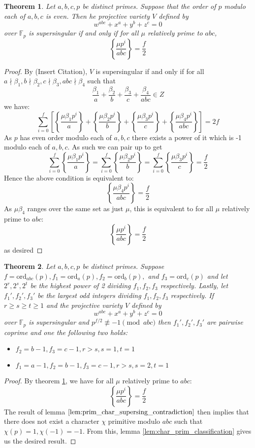 \documentclass{article}
\newcommand{\F}{\mathbb{F}}
\newcommand{\ord}[0]{\mathrm{ord}}
\newcommand{\frp}[2]{\left\{\frac{#1}{#2}\right\}}
\newtheorem{theorem}{Theorem}[section]
\theoremstyle{definition}
\theoremstyle{definition}
\theoremstyle{remark}
\begin{document}
\begin{theorem} \label{thm:sum_mu_abc_supersing_cond}
Let $a,b,c,p$ be distinct primes. Suppose that the order of $p$ modulo each of $a,b,c$ is even. Then
he projective variety $V$ defined by
\[w^{abc} + x^a + y^b + z^c =0\]
over $\F_p$ is supersingular if and only if for all $\mu$ relatively prime to $abc$,
\[\frp{\mu p^i}{abc} = \frac{f}{2}\]
\end{theorem}
\begin{proof}
By (Insert Citation), $V$ is supersingular if and only if for all $a\nmid \beta_1, b\nmid \beta_2, c\nmid \beta_3, abc \nmid \beta_4$ such that
\[\frac{\beta_1}{a} + \frac{\beta_2}{b} + \frac{\beta_3}{c} + \frac{\beta_4}{abc} \in Z\] 
we have:
\[\sum_{i = 0}^f \left[\frp{ \mu\beta_1 p^i}{a} + \frp{\mu \beta_2 p^i }{b} + \frp{\mu \beta_3 p^i}{c} + \frp{\mu \beta_4 p^i}{abc}\right] = 2f \]
As $p$ has even order modulo each of $a,b,c$ there exists a power of it which is -1 modulo each of $a,b,c$. As such we can pair up to get
\[\sum_{i = 0}^f \frp{ \mu\beta_1 p^i}{a} = \sum_{i = 0}^f \frp{ \mu\beta_2 p^i}{b} = \sum_{i = 0}^f \frp{ \mu\beta_3 p^i}{c} = \frac{f}{2}\]
Hence the above condition is equivalent to:
\[\frp{\mu \beta_4 p^i}{abc} = \frac{f}{2}\]
As $\mu\beta_4$ ranges over the same set as just $\mu$, this is equivalent to for all $\mu$ relatively prime to $abc$:
\[\frp{\mu p^i}{abc} = \frac{f}{2}\]
as desired
\end{proof}

\begin{theorem} \label{thm:a_b_c_supersingular_cond1} Let $a,b,c,p$ be distinct primes. Suppose $f = \ord_{abc}(p), f_1 = \ord_a(p), f_2 = \ord_b(p),$ and $f_3 = \ord_c(p)$ and let $2^r, 2^s, 2^t$ be the highest power of 2 dividing $f_1, f_2, f_3$ respectively. Lastly, let $f_1', f_2', f_3'$ be the largest odd integers dividing $f_1, f_2, f_3$ respectively. If $r \ge s \ge t \ge 1$ and the projective variety $V$ defined by
\[w^{abc} + x^a + y^b + z^c =0\]
over $\F_p$ is supersingular and $p^{f/2} \not\equiv -1 \pmod{abc}$ then $f_1', f_2', f_3'$ are pairwise coprime and one the following two holds:
\begin{itemize}
\item $f_2 = b - 1, f_3 = c - 1, r > s, s = 1, t = 1$
\item $f_1 = a - 1, f_2 = b - 1, f_3 = c - 1, r > s, s = 2, t = 1$
\end{itemize}
\end{theorem}

\begin{proof}
By theorem  \ref{thm:sum_mu_abc_supersing_cond}, we have for all $\mu$ relatively prime to $abc$:
\[\frp{\mu p^i}{abc} = \frac{f}{2}\]
The result of lemma $\ref{lem:prim_char_supersing_contradiction}$ then implies that there does not exist a character $\chi$ primitive modulo $abc$ such that $\chi(p) = 1, \chi(-1) = -1$. From this, lemma \ref{lem:char_prim_classification} gives us the desired result.
\end{proof}
\end{document}
